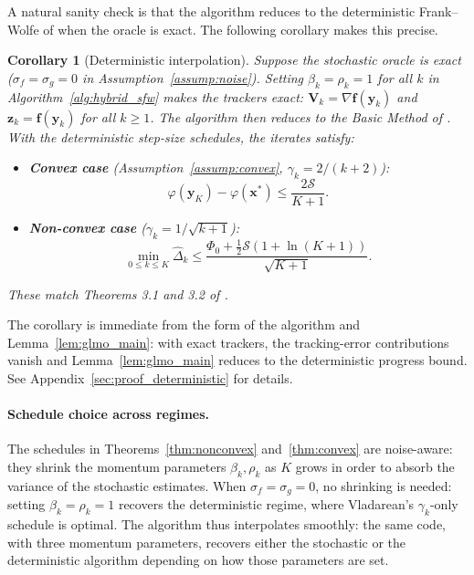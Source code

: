 \documentclass{article}
\def\vf{{\bm{f}}}
\def\vx{{\bm{x}}}
\def\vy{{\bm{y}}}
\def\vz{{\bm{z}}}
\def\mV{{\bm{V}}}
\newtheorem{corollary}{Corollary}
\begin{document}
A natural sanity check is that the algorithm reduces to the deterministic Frank--Wolfe of \citet{vladarean2023first} when the oracle is exact. The following corollary makes this precise.

\begin{corollary}[Deterministic interpolation] \label{cor:deterministic}
Suppose the stochastic oracle is exact ($\sigma_f = \sigma_g = 0$ in Assumption~\ref{assump:noise}). Setting $\beta_k = \rho_k = 1$ for all $k$ in Algorithm~\ref{alg:hybrid_sfw} makes the trackers exact: $\mV_k = \nabla \vf(\vy_k)$ and $\vz_k = \vf(\vy_k)$ for all $k \ge 1$. The algorithm then reduces to the Basic Method of \citet{vladarean2023first}. With the deterministic step-size schedules, the iterates satisfy:
\begin{itemize}
\item \textbf{Convex case} (Assumption~\ref{assump:convex}, $\gamma_k = 2/(k+2)$):
\[
\varphi(\vy_K) - \varphi(\vx^*) \le \frac{2 \mathcal{S}}{K+1}.
\]
\item \textbf{Non-convex case} ($\gamma_k = 1/\sqrt{k+1}$):
\[
\min_{0 \le k \le K} \hat\Delta_k \le \frac{\Phi_0 + \tfrac{1}{2}\mathcal{S}(1 + \ln(K+1))}{\sqrt{K+1}}.
\]
\end{itemize}
These match Theorems 3.1 and 3.2 of \citet{vladarean2023first}.
\end{corollary}

The corollary is immediate from the form of the algorithm and Lemma~\ref{lem:glmo_main}: with exact trackers, the tracking-error contributions vanish and Lemma~\ref{lem:glmo_main} reduces to the deterministic progress bound. See Appendix~\ref{sec:proof_deterministic} for details.

\paragraph{Schedule choice across regimes.}
The schedules in Theorems~\ref{thm:nonconvex} and~\ref{thm:convex} are noise-aware: they shrink the momentum parameters $\beta_k, \rho_k$ as $K$ grows in order to absorb the variance of the stochastic estimates. When $\sigma_f = \sigma_g = 0$, no shrinking is needed: setting $\beta_k = \rho_k = 1$ recovers the deterministic regime, where Vladarean's $\gamma_k$-only schedule is optimal. The algorithm thus interpolates smoothly: the same code, with three momentum parameters, recovers either the stochastic or the deterministic algorithm depending on how those parameters are set.
\end{document}
